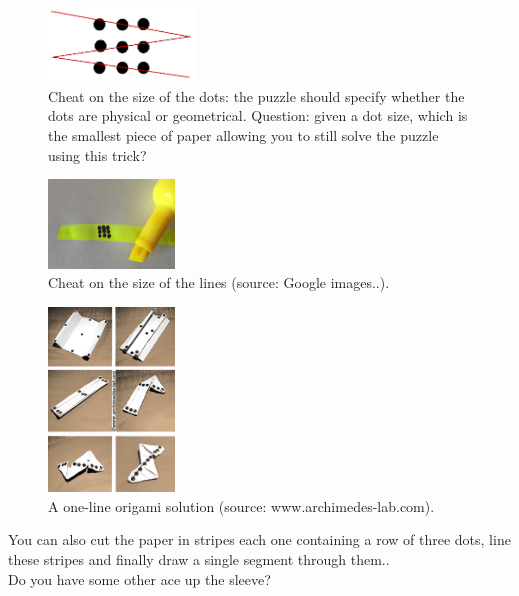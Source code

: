 \documentclass[11pt]{article}
\begin{document}
\begin{figure}
\includegraphics[width=0.35\textwidth]{images/nine-dots-finite-width.png}
\caption{Cheat on the size of the dots: the puzzle should specify whether the dots are physical or geometrical. Question: given a dot size, which is the smallest piece of paper allowing you to still solve the puzzle using this trick?}
\label{nine-dots-dots-width}
\end{figure}

\begin{figure}
\includegraphics[width=0.3\textwidth]{images/9-dots-line-width.png}
\caption{Cheat on the size of the lines (source: Google images..).}
\label{nine-dots-line-width}
\end{figure}

\begin{figure}
\includegraphics[width=0.3\textwidth]{images/9-dots-origami-solution.png}
\caption{A one-line origami solution (source: www.archimedes-lab.com).}
\label{nine-dots-origami-solution}
\end{figure}

You can also cut the paper in stripes each one containing a row of three dots, line these stripes and finally draw a single segment through them..\\
Do you have some other ace up the sleeve?
\end{document}

